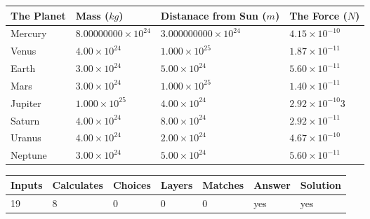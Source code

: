 \documentclass[12pt]{article}
\begin{document}
\vspace{0.2in}
 
 
\begin{tabular}{|l|l|l|l|}
\hline
The Planet & Mass ($kg$) & Distanace from Sun ($m$) & The Force ($N$)\\
\hline
Mercury  &
           $ %
8.00000000 \times 10^{24}  $   &
             $ %
3.000000000 \times 10^{24}$    & $ %
4.15 \times 10^{-10} $
\\  \hline
Venus    &
           $  %
4.00 \times 10^{24}  $     &
             $ %
1.000 \times 10^{25} $    & $ %
1.87 \times 10^{-11} $
\\  \hline
Earth    &
           $  %
3.00 \times 10^{24}$     &
             $ %
5.00 \times 10^{24} $    & $ %
5.60 \times 10^{-11} $
\\   \hline
Mars     &
           $  %
3.00 \times 10^{24} $     &
             $ %
1.000 \times 10^{25}$    & $ %
1.40 \times 10^{-11} $
\\   \hline
Jupiter  &
           $  %
1.000 \times 10^{25}  $    &
             $ %
4.00 \times 10^{24} $    & $ %
2.92 \times 10^{-10}3 $
\\  \hline
Saturn   &
           $  %
4.00 \times 10^{24}   $    &
             $ %
8.00 \times 10^{24}  $    & $ %
2.92 \times 10^{-11} $
\\  \hline
Uranus   &
           $  %
4.00 \times 10^{24} $    &
             $ %
2.00 \times 10^{24}$    & $ %
4.67 \times 10^{-10} $
\\  \hline
Neptune  &
           $  %
3.00 \times 10^{24}  $    &
             $ %
5.00 \times 10^{24} $    & $ %
5.60 \times 10^{-11} $
\\  \hline
 
\end{tabular}
 
 
 
 
\noindent{}
 
 

 
\vspace{0.3in}
   
   
   
   
\noindent\begin{tabular}{|l|l|l|l|l|l|l|}
 \hline
Inputs & Calculates & Choices & Layers & Matches & Answer & Solution \\ \hline
          19  & 
           8  & 
           0
  & 
           0  & 
           0  & 
  yes & 
  yes 
  \\ \hline
 \end{tabular}
   
\end{document}
